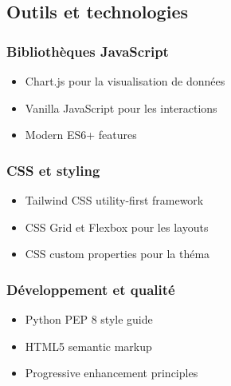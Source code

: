 \documentclass[a4paper,11pt]{article}
\begin{document}
    \subsection{Outils et technologies}

        \subsubsection{Bibliothèques JavaScript}
            \begin{itemize}
                \item Chart.js pour la visualisation de données
                \item Vanilla JavaScript pour les interactions
                \item Modern ES6+ features
            \end{itemize}

        \subsubsection{CSS et styling}
            \begin{itemize}
                \item Tailwind CSS utility-first framework
                \item CSS Grid et Flexbox pour les layouts
                \item CSS custom properties pour la théma
            \end{itemize}

        \subsubsection{Développement et qualité}
            \begin{itemize}
                \item Python PEP 8 style guide
                \item HTML5 semantic markup
                \item Progressive enhancement principles
            \end{itemize}
\end{document}

